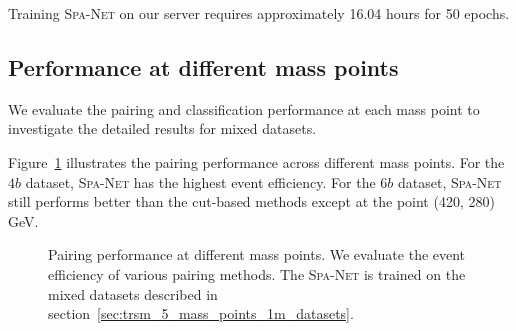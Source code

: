 \documentclass[12pt]{article}
\begin{document}
    Training \textsc{Spa-Net} on our server requires approximately 16.04 hours for 50 epochs.
    
    \subsection{Performance at different mass points}%
    \label{sub:performance_at_different_mass_points}
        We evaluate the pairing and classification performance at each mass point to investigate the detailed results for mixed datasets.

        Figure~\ref{fig:pairing_performance_each_mass_point-TRSM-mix_5-1M} illustrates the pairing performance across different mass points. For the $4b$ dataset, \textsc{Spa-Net} has the highest event efficiency. For the $6b$ dataset, \textsc{Spa-Net} still performs better than the cut-based methods except at the point (420, 280) GeV.
        \begin{figure}[htpb]
            \centering
            \caption{Pairing performance at different mass points. We evaluate the event efficiency of various pairing methods. The \textsc{Spa-Net} is trained on the mixed datasets described in section~\ref{sec:trsm_5_mass_points_1m_datasets}.}  
            \label{fig:pairing_performance_each_mass_point-TRSM-mix_5-1M}  
        \end{figure}
\end{document}
